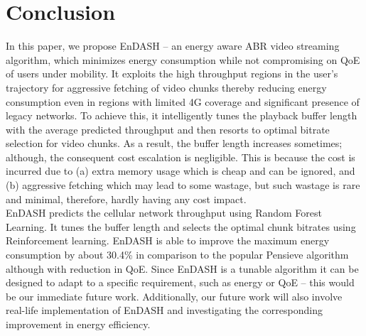 \section{\textbf{Conclusion}}\label{sec:chap04:conclusion}
\acresetall
In this paper, we propose EnDASH -- an energy aware ABR video streaming algorithm, which minimizes energy consumption while not compromising on QoE of users under mobility. It exploits the high throughput regions in the user's trajectory for aggressive fetching of video chunks thereby reducing energy consumption even in regions with limited 4G coverage and significant presence of legacy networks.  To achieve this, it intelligently tunes the playback buffer length with the average predicted throughput and then resorts to optimal bitrate selection for video chunks. As a result, the buffer length increases sometimes; although, the consequent cost  escalation is negligible. This is because the cost is incurred due to  (a) extra memory usage which is cheap  and can be ignored, and (b) aggressive fetching which may lead to some wastage, but such wastage is rare and minimal, therefore, hardly having any cost impact.\\  %
\indent EnDASH predicts the cellular network throughput using Random Forest Learning. It tunes the buffer length and selects the optimal chunk bitrates using Reinforcement learning. EnDASH is able to improve the maximum energy consumption by about 30.4\% in comparison to the popular Pensieve algorithm although with reduction in QoE. Since EnDASH is a tunable algorithm it can be designed to adapt to a specific  requirement, such as energy or QoE -- this would be our immediate future work.  Additionally, our future work will also involve real-life implementation of EnDASH and investigating the corresponding improvement in energy efficiency.